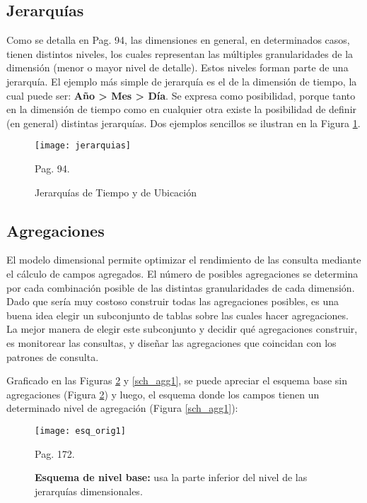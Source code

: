 \documentclass[a4paper,11pt]{article}
\begin{document}
    
    \subsection{Jerarquías}
    
    Como se detalla en \cite{olap_solutions} Pag. 94, las dimensiones en general, en determinados casos, tienen distintos niveles, los cuales representan las
    múltiples granularidades de la dimensión (menor o mayor nivel de detalle). Estos niveles forman parte de una jerarquía. El ejemplo más simple de
    jerarquía es el de la dimensión de tiempo, la cual puede ser: \textbf{Año > Mes > Día}. Se expresa como posibilidad, porque tanto en la dimensión de
    tiempo como en cualquier otra existe la posibilidad de definir (en general) distintas jerarquías. Dos ejemplos sencillos se ilustran en la Figura
    \ref{jerarquias}.
    
    \begin{figure}
      \begin{center}
        \texttt{[image: jerarquias]}
        \caption{Jerarquías de Tiempo y de Ubicación} \cite{olap_solutions} Pag. 94.
        \label{jerarquias}
      \end{center}
    \end{figure}
    
    
    \subsection{Agregaciones}
    
    El modelo dimensional permite optimizar el rendimiento de las consulta mediante el cálculo de campos agregados. El número de posibles agregaciones se
    determina por cada combinación posible de las distintas granularidades de cada dimensión. Dado que sería muy costoso construir todas las agregaciones 
    posibles, es una buena idea elegir un subconjunto de tablas sobre las cuales hacer agregaciones. La mejor manera de elegir este subconjunto y decidir qué 
    agregaciones construir, es monitorear las consultas, y diseñar las agregaciones que coincidan con los patrones de consulta.\par
    
    Graficado en las Figuras \ref{sch_orig1} y \ref{sch_agg1}, se puede apreciar el esquema base sin agregaciones (Figura \ref{sch_orig1}) y luego, el esquema
    donde los campos tienen un determinado nivel de agregación (Figura \ref{sch_agg1}):
    
    \begin{figure}
      \begin{center}
        \texttt{[image: esq\_orig1]}
        \caption{\textbf{Esquema de nivel base:} usa la parte inferior del nivel de las jerarquías dimensionales.} \cite{nagabhushana} Pag. 172.
        \label{sch_orig1}
      \end{center}
    \end{figure}
    
\end{document}
